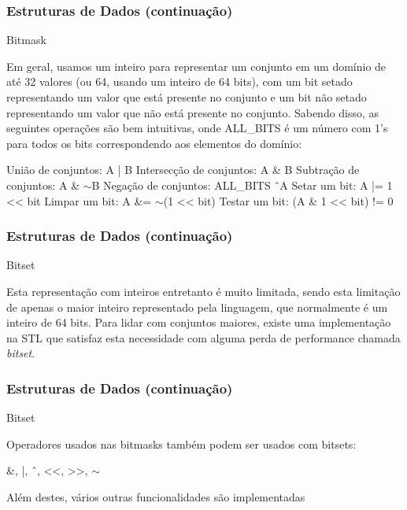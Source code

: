\begin{frame}
\frametitle{Estruturas de Dados (continuação)}
\begin{block}{Bitmask}
\begin{itemize}
	\bitem Em geral, usamos um inteiro para representar um conjunto em um domínio de até 32 valores (ou 64, usando um inteiro de 64 bits), com um bit setado representando um valor que está presente no conjunto e um bit não setado representando um valor que não está presente no conjunto.
	\bitem Sabendo disso, as seguintes operações são bem intuitivas, onde ALL\_BITS é um número com 1's para todos os bits correspondendo aos elementos do domínio:
	\begin{itemize}
		\bitem União de conjuntos: A | B
		\bitem Intersecção de conjuntos: A \& B
		\bitem Subtração de conjuntos: A \& $\sim$B
		\bitem Negação de conjuntos: ALL\_BITS \^\ A
		\bitem Setar um bit: A |= 1 << bit
		\bitem Limpar um bit: A \&= $\sim$(1 << bit)
		\bitem Testar um bit: (A \& 1 << bit) != 0
	\end{itemize}
\end{itemize}
\end{block}
\end{frame}

\begin{frame}
\frametitle{Estruturas de Dados (continuação)}
\begin{block}{Bitset}
\begin{itemize}
	\bitem Esta representação com inteiros entretanto é muito limitada, sendo esta limitação de apenas o maior inteiro representado pela linguagem, que normalmente é um inteiro de 64 bits.
	\bitem Para lidar com conjuntos maiores, existe uma implementação na STL que satisfaz esta necessidade com alguma perda de performance chamada \textit{bitset}.
\end{itemize}
\end{block}

\end{frame}

\begin{frame}
\frametitle{Estruturas de Dados (continuação)}
\begin{block}{Bitset}
\begin{itemize}
	\bitem Operadores usados nas bitmasks também podem ser usados com bitsets:
	\begin{itemize}
		\bitem \&, |, \^\ , <<, >>, $\sim$
	\end{itemize}
	\bitem Além destes, vários outras funcionalidades são implementadas
\end{itemize}
\end{block}
\end{frame}


